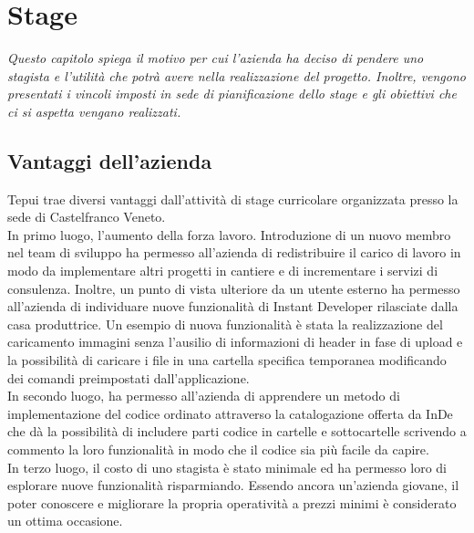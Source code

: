 \chapter{Stage}
\textit{Questo capitolo spiega il motivo per cui l'azienda ha deciso di pendere uno stagista e l'utilità che potrà avere nella realizzazione del progetto. Inoltre, vengono presentati i vincoli imposti in sede di pianificazione dello stage e gli obiettivi che ci si aspetta vengano realizzati.}

\section{Vantaggi dell'azienda}
Tepui trae diversi vantaggi dall'attività di stage curricolare organizzata presso la sede di Castelfranco Veneto.\\

In primo luogo, l'aumento della forza lavoro. Introduzione di un nuovo membro nel team di sviluppo ha permesso all'azienda di redistribuire il carico di lavoro in modo da implementare altri progetti in cantiere e di incrementare i servizi di consulenza. Inoltre, un punto di vista ulteriore da un utente esterno ha permesso all'azienda di individuare nuove funzionalità di Instant Developer rilasciate dalla casa produttrice.
Un esempio di nuova funzionalità è stata la realizzazione del caricamento immagini senza l'ausilio di informazioni di header in fase di upload e la possibilità di caricare i file in una cartella specifica temporanea modificando dei comandi preimpostati dall'applicazione.
\\

In secondo luogo, ha permesso all'azienda di apprendere un metodo di implementazione del codice ordinato attraverso la catalogazione offerta da InDe che dà la possibilità di includere parti codice in cartelle e sottocartelle scrivendo a commento la loro funzionalità in modo che il codice sia più facile da capire.
\\

In terzo luogo, il costo di uno stagista è stato minimale ed ha permesso loro di esplorare nuove funzionalità risparmiando. Essendo ancora un'azienda giovane, il poter conoscere e migliorare la propria operatività a prezzi minimi è considerato un ottima occasione. 


